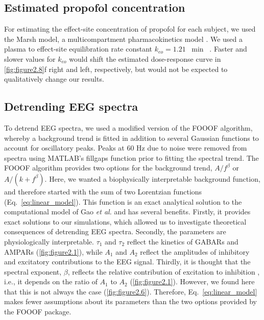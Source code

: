 \subsection{Estimated propofol concentration}
For estimating the effect-site concentration of propofol for each subject, we used the Marsh model, a multicompartment pharmacokinetics model \cite{Marsh1991}. We used a plasma to effect-site equilibration rate constant $k_{eo}=1.21$ \unit{\per\minute} ~\cite{Struys2000}. Faster and slower values for $k_{eo}$ would shift the estimated dose-response curve in \autoref{fig:figure2.8}f right and left, respectively, but would not be expected to qualitatively change our results.

\subsection{Detrending EEG spectra}
To detrend EEG spectra, we used a modified version of the FOOOF algorithm\cite{Donoghue2020}, whereby a background trend is fitted in addition to several Gaussian functions to account for oscillatory peaks. Peaks at 60 \unit{\hertz} due to noise were removed from spectra using MATLAB’s fillgaps function prior to fitting the spectral trend. The FOOOF algorithm provides two options for the background trend, $A/f^\beta$ or $A/\left(k+f^\beta\right)$. Here, we wanted a biophysically interpretable background function, and therefore started with the sum of two Lorentzian functions (Eq.~\ref{eq:linear_model}). This function is an exact analytical solution to the computational model of Gao \textit{et al.} \cite{Gao2017} and has several benefits. Firstly, it provides exact solutions to our simulations, which allowed us to investigate theoretical consequences of detrending EEG spectra. Secondly, the parameters are physiologically interpretable. $\tau_1$ and $\tau_2$ reflect the kinetics of GABARs and AMPARs (\autoref{fig:figure2.1}), while $A_1$ and $A_2$ reflect the amplitudes of inhibitory and excitatory contributions to the EEG signal. Thirdly, it is thought that the spectral exponent, $\beta$, reflects the relative contribution of excitation to inhibition \cite{Gao2017}, i.e., it depends on the ratio of $A_1$ to $A_2$ (\autoref{fig:figure2.1}). However, we found here that this is not always the case (\autoref{fig:figure2.6}). Therefore, Eq.~\ref{eq:linear_model} makes fewer assumptions about its parameters than the two options provided by the FOOOF package.

